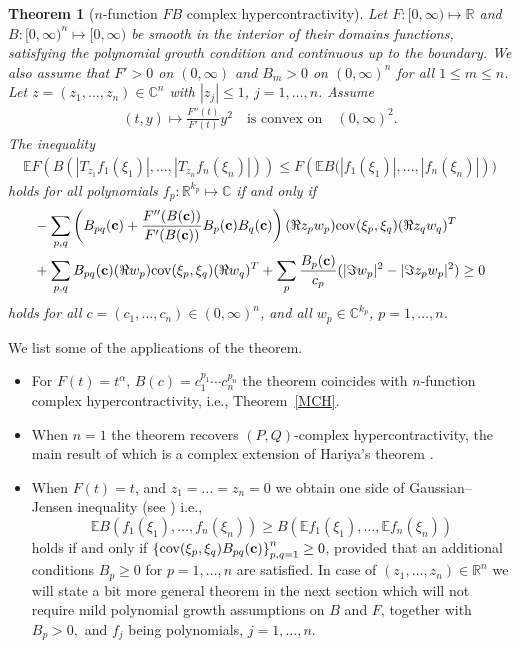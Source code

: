 \documentclass[9pt, a4paper]{amsart}
\newcommand{\1}{{\chi_{}}}%
\newtheorem{theorem}{Theorem}
\numberwithin{equation}{section}
\begin{document}
\begin{theorem}[$n$-function $FB$ complex hypercontractivity]\label{complexCaseTheorem}
	Let $F :[0,\infty) \mapsto \mathbb{R}$ and $B: [0,\infty)^{n} \mapsto [0,\infty)$ be smooth in the interior of their domains functions, satisfying the polynomial growth condition and continuous up to the boundary.  We also assume that $F'>0$ on $(0,\infty)$ and $B_m>0$ on $(0,\infty)^n$ for all $1\leq m\leq n$. Let $z=(z_{1}, \ldots, z_{n}) \in \mathbb{C}^{n}$ with $|z_{j}|\leq 1$, $j=1, \ldots, n$. Assume 
    \begin{align}\label{convexity2}
    (t,y) \mapsto \frac{F''(t)}{F'(t)}y^{2} \quad \text{is convex on}\quad  (0,\infty)^{2}. 
    \end{align}
    The inequality 
	\begin{align}\label{CNGJ}
		\mathbb{E} F(B(|T_{z_{1}}f_{1}(\xi_{1})|,\ldots, |T_{z_{n}}f_{n}(\xi_{n})|))\leq F\left( \mathbb{E}B(|f_{1}(\xi_{1})|,\ldots, |f_{n}(\xi_{n})|\right))
	\end{align}
	holds for all polynomials $f_{p}:\mathbb{R}^{k_{p}}\mapsto \mathbb{C}$ if and only if 
	\begin{align}\label{localcomplex}
		&-\sum_{p,q} \left(B_{pq}({\bf{c}})+\frac{F''(B(\bf{c}))}{F'(B(\bf{c}))} 
		B_{p}({\bf{c}})B_{q}({\bf{c}})\right) (\Re z_{p} w_{p})\mathrm{cov}(\xi_{p}, \xi_{q})(\Re z_{q} w_{q})^{T} \\
		&+\sum_{p,q}  B_{pq}({\bf{c}}) (\Re w_{p})\mathrm{cov}(\xi_{p}, \xi_{q})(\Re w_{q})^{T}   +\sum_{p}\frac{B_{p}({\bf{c}})}{c_{p}}  (|\Im w_{p}|^2-|\Im z_pw_{p}|^2)\geq0 \nonumber
	\end{align}
	holds for all $c = (c_{1}, \ldots, c_{n}) \in (0, \infty)^{n}$, and all $w_{p} \in \mathbb{C}^{k_{p}}$, $p=1,\ldots, n$. 
\end{theorem}
We list some of the applications of the theorem. 
\begin{itemize}
    \item[1.] For $F(t)=t^{\alpha}$, $B(c)=c_{1}^{p_{1}}\cdots c_{n}^{p_{n}}$ the theorem coincides with $n$-function complex hypercontractivity, i.e.,  Theorem~\ref{MCH}. 
    \item[2.]  When $n=1$ the theorem recovers $(P,Q)$-complex hypercontractivity,  the main result of \cite{IvanKal} which is a complex extension of  Hariya's theorem \cite{Hariya}. 
    \item[3.] When $F(t)=t$, and $z_{1}=\ldots=z_{n}=0$ we obtain one side of Gaussian--Jensen inequality (see \cite{Neeman14, NeemanPaouris16, IvanVol15, LedouxSlepian}) i.e., 
    $$
    \mathbb{E} B(f_{1}(\xi_{1}), \ldots, f_{n}(\xi_{n}))\geq B(\mathbb{E}f_{1}(\xi_{1}), \ldots, \mathbb{E} f_{n}(\xi_{n}))
    $$
    holds if and only if $\left\{\mathrm{cov}(\xi_{p}, \xi_{q})B_{pq}({\bf c})\right\}_{p,q=1}^{n}\geq 0$, provided that an additional conditions $B_{p}\geq 0$ for $p=1, \ldots, n$ are satisfied. In case of $(z_{1}, \ldots, z_{n})\in \mathbb{R}^{n}$ we will state a bit more general theorem in the next section which will not require mild polynomial growth assumptions on $B$ and $F$, together with $B_{p}>0,$ and $f_{j}$ being polynomials, $j=1, \ldots, n$. 
\end{itemize}
\end{document}

